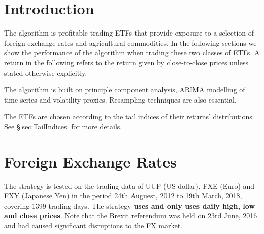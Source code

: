 \documentclass[12pt]{article}
\begin{document}
\maketitle

\section{Introduction}
The algorithm is profitable trading ETFs that provide exposure to a
selection of foreign exchange rates and agricultural commodities. In
the following sections we show the performance of the algorithm when
trading these two classes of ETFs. A return in the following refers to
the return given by close-to-close prices unless stated otherwise
explicitly.

The algorithm is built on principle component analysis, ARIMA
modelling of time series and volatility proxies. Resampling techniques
are also essential.

The ETFs are chosen according to the tail indices of their returns'
distributions. See \S\ref{sec:TailIndices} for more details.

\section{Foreign Exchange Rates}
The strategy is tested on the trading data of UUP (US dollar), FXE
(Euro) and FXY (Japanese Yen) in the period 24th Auguest, 2012 to 19th
March, 2018, covering 1399 trading days. The strategy {\bf uses and
  only uses daily high, low and close prices}. Note that the Brexit
referendum was held on 23rd June, 2016 and had caused significant
disruptions to the FX market.
\end{document}
